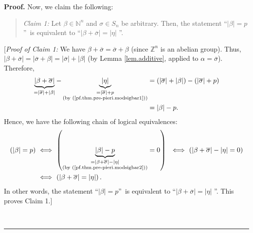 \documentclass[numbers=enddot,12pt,final,onecolumn,notitlepage,english]{scrartcl}%
\theoremstyle{definition}
\newenvironment{statement}{\begin{quote}}{\end{quote}}
\newenvironment{proof}[1][Proof]{\noindent\textbf{#1.} }{\ \rule{0.5em}{0.5em}}
\newenvironment{verlong}{}{}
\begin{document}
\begin{verlong}
\begin{proof}
Now, we claim the following:

\begin{statement}
\textit{Claim 1:} Let $\beta\in\mathbb{N}^{n}$ and $\sigma\in S_{n}$ be
arbitrary. Then, the statement \textquotedblleft$\left\vert \beta\right\vert
=p$\textquotedblright\ is equivalent to \textquotedblleft$\left\vert
\beta+\overline{\sigma}\right\vert =\left\vert \eta\right\vert $%
\textquotedblright.
\end{statement}

[\textit{Proof of Claim 1:} We have $\beta+\overline{\sigma}=\overline{\sigma
}+\beta$ (since $\mathbb{Z}^{n}$ is an abelian group). Thus, $\left\vert
\beta+\overline{\sigma}\right\vert =\left\vert \overline{\sigma}%
+\beta\right\vert =\left\vert \overline{\sigma}\right\vert +\left\vert
\beta\right\vert $ (by Lemma \ref{lem.additive}, applied to $\alpha
=\overline{\sigma}$). Therefore,%
\begin{align}
\underbrace{\left\vert \beta+\overline{\sigma}\right\vert }_{=\left\vert
\overline{\sigma}\right\vert +\left\vert \beta\right\vert }%
-\underbrace{\left\vert \eta\right\vert }_{\substack{=\left\vert
\overline{\sigma}\right\vert +p\\\text{(by (\ref{pf.thm.pre-pieri.modsigbar1}%
))}}}  &  =\left(  \left\vert \overline{\sigma}\right\vert +\left\vert
\beta\right\vert \right)  -\left(  \left\vert \overline{\sigma}\right\vert
+p\right) \nonumber\\
&  =\left\vert \beta\right\vert -p. \label{pf.thm.pre-pieri.modsigbar2}%
\end{align}
Hence, we have the following chain of logical equivalences:%
\begin{align*}
\left(  \left\vert \beta\right\vert =p\right)  \  &  \Longleftrightarrow
\ \left(  \underbrace{\left\vert \beta\right\vert -p}_{\substack{=\left\vert
\beta+\overline{\sigma}\right\vert -\left\vert \eta\right\vert \\\text{(by
(\ref{pf.thm.pre-pieri.modsigbar2}))}}}=0\right)  \ \ \Longleftrightarrow
\ \left(  \left\vert \beta+\overline{\sigma}\right\vert -\left\vert
\eta\right\vert =0\right) \\
&  \Longleftrightarrow\ \left(  \left\vert \beta+\overline{\sigma}\right\vert
=\left\vert \eta\right\vert \right)  .
\end{align*}
In other words, the statement \textquotedblleft$\left\vert \beta\right\vert
=p$\textquotedblright\ is equivalent to \textquotedblleft$\left\vert
\beta+\overline{\sigma}\right\vert =\left\vert \eta\right\vert $%
\textquotedblright. This proves Claim 1.] \medskip


\end{proof}
\end{verlong}
\end{document}
